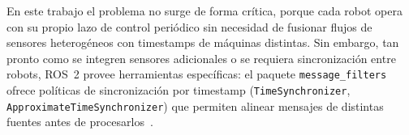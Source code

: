 En este trabajo el problema no surge de forma crítica, porque cada robot opera con su propio lazo de control periódico sin necesidad de fusionar flujos de sensores heterogéneos con timestamps de máquinas distintas. Sin embargo, tan pronto como se integren sensores adicionales o se requiera sincronización entre robots, ROS~2 provee herramientas específicas: el paquete \texttt{message\_filters} ofrece políticas de sincronización por timestamp (\texttt{TimeSynchronizer}, \texttt{ApproximateTimeSynchronizer}) que permiten alinear mensajes de distintas fuentes antes de procesarlos~\cite{ros2docs}.
